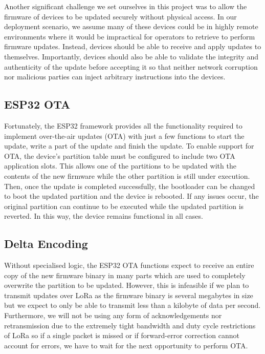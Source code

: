 \documentclass[conference]{IEEEtran}
\begin{document}
Another significant challenge we set ourselves in this project was to allow the firmware of devices to be updated securely without physical access. In our deployment scenario, we assume many of these devices could be in highly remote environments where it would be impractical for operators to retrieve to perform firmware updates. Instead, devices should be able to receive and apply updates to themselves. Importantly, devices should also be able to validate the integrity and authenticity of the update before accepting it so that neither network corruption nor malicious parties can inject arbitrary instructions into the devices.

\subsection{ESP32 OTA}

Fortunately, the ESP32 framework provides all the functionality required to implement over-the-air updates (OTA) with just a few functions to start the update, write a part of the update and finish the update. To enable support for OTA, the device's partition table must be configured to include two OTA application slots. This allows one of the partitions to be updated with the contents of the new firmware while the other partition is still under execution. Then, once the update is completed successfully, the bootloader can be changed to boot the updated partition and the device is rebooted. If any issues occur, the original partition can continue to be executed while the updated partition is reverted. In this way, the device remains functional in all cases.

\subsection{Delta Encoding}

Without specialised logic, the ESP32 OTA functions expect to receive an entire copy of the new firmware binary in many parts which are used to completely overwrite the partition to be updated. However, this is infeasible if we plan to transmit updates over LoRa as the firmware binary is several megabytes in size but we expect to only be able to transmit less than a kilobyte of data per second. Furthermore, we will not be using any form of acknowledgements nor retransmission due to the extremely tight bandwidth and duty cycle restrictions of LoRa so if a single packet is missed or if forward-error correction cannot account for errors, we have to wait for the next opportunity to perform OTA.
\end{document}
